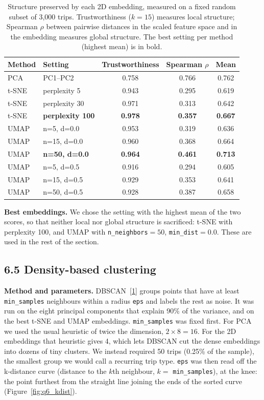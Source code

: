 \documentclass{article}
\begin{document}
\begin{table}[!htbp]
  \caption{Structure preserved by each 2D embedding, measured on a fixed random subset of 3{,}000 trips. Trustworthiness ($k=15$) measures local structure; Spearman $\rho$ between pairwise distances in the scaled feature space and in the embedding measures global structure. The best setting per method (highest mean) is in bold.}
  \label{tab:q6_scores}
  \centering
  \small
  \begin{tabular}{llccc}
    \toprule
    Method & Setting & Trustworthiness & Spearman $\rho$ & Mean \\
    \midrule
    PCA & PC1--PC2 & 0.758 & 0.766 & 0.762 \\
    \midrule
    t-SNE & perplexity 5 & 0.943 & 0.295 & 0.619 \\
    t-SNE & perplexity 30 & 0.971 & 0.313 & 0.642 \\
    t-SNE & \textbf{perplexity 100} & \textbf{0.978} & \textbf{0.357} & \textbf{0.667} \\
    \midrule
    UMAP & n=5, d=0.0 & 0.953 & 0.319 & 0.636 \\
    UMAP & n=15, d=0.0 & 0.960 & 0.368 & 0.664 \\
    UMAP & \textbf{n=50, d=0.0} & \textbf{0.964} & \textbf{0.461} & \textbf{0.713} \\
    UMAP & n=5, d=0.5 & 0.916 & 0.294 & 0.605 \\
    UMAP & n=15, d=0.5 & 0.929 & 0.353 & 0.641 \\
    UMAP & n=50, d=0.5 & 0.928 & 0.387 & 0.658 \\
    \bottomrule
  \end{tabular}
\end{table}

\textbf{Best embeddings.} We chose the setting with the highest mean of the two scores, so that neither local nor global structure is sacrificed: t-SNE with perplexity 100, and UMAP with \texttt{n\_neighbors}$=50$, \texttt{min\_dist}$=0.0$. These are used in the rest of the section.

\subsection*{6.5 Density-based clustering}

\textbf{Method and parameters.} DBSCAN~\hyperref[ref:1]{[1]} groups points that have at least \texttt{min\_samples} neighbours within a radius \texttt{eps} and labels the rest as noise. It was run on the eight principal components that explain 90\% of the variance, and on the best t-SNE and UMAP embeddings. \texttt{min\_samples} was fixed first. For PCA we used the usual heuristic of twice the dimension, $2\times8=16$. For the 2D embeddings that heuristic gives 4, which lets DBSCAN cut the dense embeddings into dozens of tiny clusters. We instead required 50 trips (0.25\% of the sample), the smallest group we would call a recurring trip type. \texttt{eps} was then read off the k-distance curve (distance to the $k$th neighbour, $k=$ \texttt{min\_samples}), at the knee: the point furthest from the straight line joining the ends of the sorted curve (Figure~\ref{fig:q6_kdist}).
\end{document}
